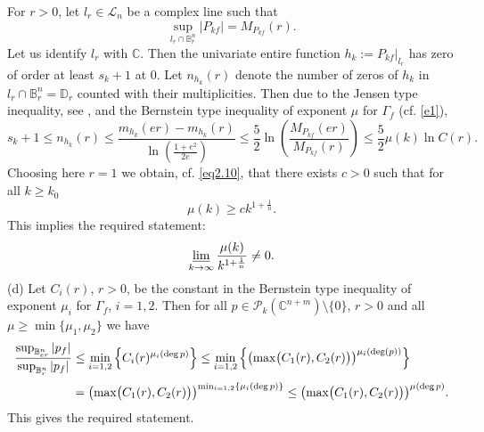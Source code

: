 \documentclass[11pt, oneside]{amsart}
\begin{document}
For $r>0$, let $l_r \in\mathcal L_n$ be a complex line  such that
\[
\sup_{l_r\cap \mathbb B_r^n}|P_{kf}|=M_{P_{kf}}(r).
\]
Let us identify $l_r$ with $\mathbb C$. Then the univariate entire function $h_k:=P_{kf}|_{l_r}$ has zero of order at least $s_k+1$ at $0$. Let $n_{h_k}(r)$ denote the number of zeros of $h_k$ in $l_r\cap \mathbb B_r^n=\mathbb D_r$ counted with their multiplicities. Then due to the Jensen type inequality, see \cite[Lm.\,1]{VP}, and the Bernstein type inequality of exponent $\mu$ for $\Gamma_f$ (cf. \eqref{e1}),
\[
s_{k}+1\le n_{h_k}(r)\le \frac{m_{h_k}(er)-m_{h_k}(r)}{\ln\left(\frac{1+e^2}{2e}\right)}\le \frac 52\ln\left(\frac{M_{P_{kf}}(er)}{M_{P_{kf}}(r)}\right)\le \frac 52 \mu(k)\ln C(r).
\]
Choosing here $r=1$ we obtain, cf. \eqref{eq2.10}, that there exists $c>0$ such that for all $k\ge k_0$
\[
\mu(k)\ge c k^{1+\frac 1n}.
\]
This implies the required statement:
\[
\varliminf_{k\rightarrow\infty}\frac{\mu(k)}{k^{1+\frac 1n}}\ne 0.
\]
(d) Let $C_i(r)$, $r>0$, be the constant in the Bernstein type inequality of exponent $\mu_i$ for $\Gamma_f$, $i=1,2$.
Then for all $p\in\mathcal P_k(\mathbb C^{n+m})\setminus\{0\}$, $r>0$ and all $\mu\ge\min\{\mu_1,\mu_2\}$ we have
\[
\begin{array}{l}
\displaystyle
\frac{\sup_{\mathbb B^n_{er}} |p_f|}{\sup_{\mathbb B^n_r} |p_f|}\le \min_{i=1,2}\left\{C_i(r)^{\mu_i({\rm deg}\,p)}\right\} \le\min_{i=1,2}\left\{\left(\max\bigl(C_1(r),C_2(r)\bigr)\right)^{\mu_i({\rm deg}(p))}\right\} \medskip\\
\displaystyle \quad\qquad\qquad =\bigl(\max\bigl(C_1(r),C_2(r)\bigr)\bigr)^{\min_{i=1,2}\left\{\mu_i({\rm deg}\,p)\right\}}\le \bigl(\max\bigl(C_1(r),C_2(r)\bigr)\bigr)^{\mu({\rm deg}\,p)}.
\end{array}
\]
This gives the required statement.\smallskip
\end{document}

